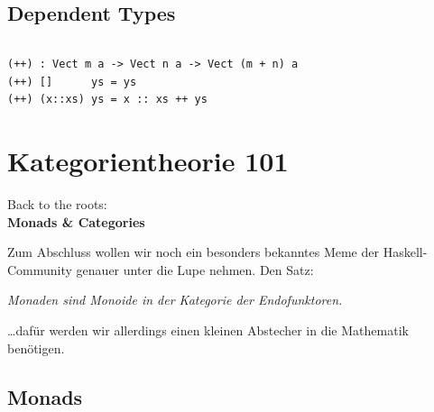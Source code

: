 \documentclass{beamer}
\begin{document}
\subsection*{Dependent Types}

\begin{frame}[fragile]

\begin{verbatim}
\end{verbatim}

\begin{verbatim}
(++) : Vect m a -> Vect n a -> Vect (m + n) a
(++) []      ys = ys
(++) (x::xs) ys = x :: xs ++ ys
\end{verbatim}

\end{frame}

\section*{Kategorientheorie 101}

\begin{frame}

\begin{center}
Back to the roots:\\
\Large \textbf{Monads \& Categories}
\end{center}

\end{frame}


\begin{frame}
Zum Abschluss wollen wir noch ein besonders bekanntes Meme der Haskell-Community genauer
unter die Lupe nehmen. Den Satz:

\begin{center}
\textit{\glqq Monaden sind Monoide in der Kategorie der Endofunktoren.\grqq}
\end{center}
\pause

\dots dafür werden wir allerdings einen kleinen Abstecher in die Mathematik benötigen.
\end{frame}

\subsection*{Monads}
\end{document}
